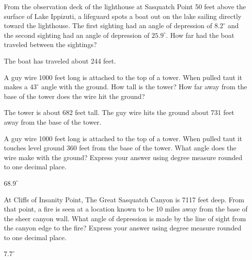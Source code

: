 \documentclass{ximera}
\begin{document}
\begin{problem}
From the observation deck of the lighthouse at Sasquatch Point 50 feet above the surface of Lake Ippizuti, a lifeguard spots a boat out on the lake sailing directly toward the lighthouse.  The first sighting had an angle of depression of $8.2^{\circ}$ and the second sighting had an angle of depression of $25.9^{\circ}$.  How far had the boat traveled between the sightings?

\begin{solution}
The boat has traveled about 244 feet.
\end{solution}
\end{problem}


\begin{problem}
A guy wire 1000 feet long is attached to the top of a tower.  When pulled taut it makes a $43^{\circ}$ angle with the ground.  How tall is the tower?  How far away from the base of the tower does the wire hit the ground?

\begin{solution}
The tower is about 682 feet tall. The guy wire hits the ground about  731 feet away from the base of the tower.
\end{solution}
\end{problem}



\begin{problem}
A guy wire 1000 feet long is attached to the top of a tower.  When pulled taut it touches level ground 360 feet from the base of the tower.  What angle does the wire make with the ground?  Express your answer using degree measure rounded to one decimal place.

\begin{solution}
$68.9^{\circ}$
\end{solution}
\end{problem}

\begin{problem}
At Cliffs of Insanity Point, The Great Sasquatch Canyon is 7117 feet deep.  From that point, a fire is seen at a location known to be 10 miles away from the base of the sheer canyon wall.  What angle of depression is made by the line of sight from the canyon edge to the fire?  Express your answer using degree measure rounded to one decimal place.

\begin{solution}
$7.7^{\circ}$
\end{solution}
\end{problem}
\end{document}
